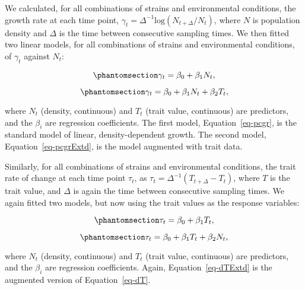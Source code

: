 \documentclass[
  letterpaper,
  DIV=11,
  numbers=noendperiod]{scrartcl}
\begin{document}
We calculated, for all combinations of strains and environmental
conditions, the growth rate at each time point,
\(\gamma_t=\Delta^{-1}\textrm{log}(N_{t+\Delta}/N_t)\), where \(N\) is
population density and \(\Delta\) is the time between consecutive
sampling times. We then fitted two linear models, for all combinations
of strains and environmental conditions, of \(\gamma_t\) against
\(N_t\):

\begin{equation}\phantomsection\label{eq-pcgr}{
\gamma_t = \beta_0 + \beta_1 N_t,
}\end{equation}

\begin{equation}\phantomsection\label{eq-pcgrExtd}{
\gamma_t = \beta_0 + \beta_1 N_t + \beta_2 T_t,
}\end{equation}

where \(N_t\) (density, continuous) and \(T_t\) (trait value,
continuous) are predictors, and the \(\beta_i\) are regression
coefficients. The first model, Equation~\ref{eq-pcgr}, is the standard
model of linear, density-dependent growth. The second model,
Equation~\ref{eq-pcgrExtd}, is the model augmented with trait data.

Similarly, for all combinations of strains and environmental conditions,
the trait rate of change at each time point \(\tau_t\), as
\(\tau_t=\Delta^{-1}(T_{t+\Delta}-T_{t})\), where \(T\) is the trait
value, and \(\Delta\) is again the time between consecutive sampling
times. We again fitted two models, but now using the trait values as the
response variables:

\begin{equation}\phantomsection\label{eq-dT}{
\tau_t = \beta_0 + \beta_1 T_t,
}\end{equation}

\begin{equation}\phantomsection\label{eq-dTExtd}{
\tau_t = \beta_0 + \beta_1 T_t + \beta_2 N_t,
}\end{equation}

where \(N_t\) (density, continuous) and \(T_t\) (trait value,
continuous) are predictors, and the \(\beta_i\) are regression
coefficients. Again, Equation~\ref{eq-dTExtd} is the augmented version
of Equation~\ref{eq-dT}.
\end{document}
